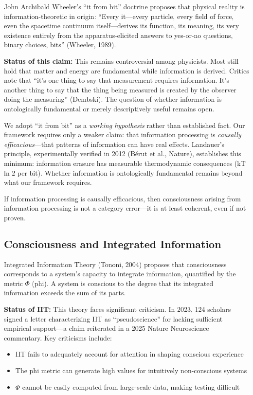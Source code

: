 \documentclass[12pt,a4paper]{article}
\begin{document}
John Archibald Wheeler's ``it from bit'' doctrine proposes that physical reality is information-theoretic in origin: ``Every it---every particle, every field of force, even the spacetime continuum itself---derives its function, its meaning, its very existence entirely from the apparatus-elicited answers to yes-or-no questions, binary choices, bits'' (Wheeler, 1989).

\textbf{Status of this claim:} This remains controversial among physicists. Most still hold that matter and energy are fundamental while information is derived. Critics note that ``it's one thing to say that measurement requires information. It's another thing to say that the thing being measured is created by the observer doing the measuring'' (Dembski). The question of whether information is ontologically fundamental or merely descriptively useful remains open.

We adopt ``it from bit'' as a \textit{working hypothesis} rather than established fact. Our framework requires only a weaker claim: that information processing is \textit{causally efficacious}---that patterns of information can have real effects. Landauer's principle, experimentally verified in 2012 (B\'{e}rut et al., Nature), establishes this minimum: information erasure has measurable thermodynamic consequences (kT ln 2 per bit). Whether information is ontologically fundamental remains beyond what our framework requires.

If information processing is causally efficacious, then consciousness arising from information processing is not a category error---it is at least coherent, even if not proven.

\subsection{Consciousness and Integrated Information}

Integrated Information Theory (Tononi, 2004) proposes that consciousness corresponds to a system's capacity to integrate information, quantified by the metric $\Phi$ (phi). A system is conscious to the degree that its integrated information exceeds the sum of its parts.

\textbf{Status of IIT:} This theory faces significant criticism. In 2023, 124 scholars signed a letter characterizing IIT as ``pseudoscience'' for lacking sufficient empirical support---a claim reiterated in a 2025 Nature Neuroscience commentary. Key criticisms include:

\begin{itemize}
    \item IIT fails to adequately account for attention in shaping conscious experience
    \item The phi metric can generate high values for intuitively non-conscious systems
    \item $\Phi$ cannot be easily computed from large-scale data, making testing difficult
\end{itemize}
\end{document}
